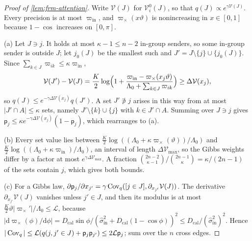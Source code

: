 \begin{proof}[Proof of \cref{lem:frm-attention}]
Write $\mathcal V(J)$ for $\mathcal V^0_i(J)$, so that $q(J)\propto e^{\gamma\mathcal V(J)}$. Every precision is at most $\varpi_{\mathrm{in}}$, and $\varpi_\times(x\vartheta)$ is nonincreasing in $x\in[0,1]$ because $1-\cos$ increases on $[0,\pi]$.

(a) Let $J\ni j$. It holds at most $\kappa-1\le n-2$ in-group senders, so some in-group sender is outside $J$; let $j_0(J)$ be the smallest such and $J'=J\setminus\{j\}\cup\{j_0(J)\}$. Since $\sum_{k\in J}\varpi_{ik}\le\kappa\varpi_{\mathrm{in}}$,
\begin{equation*}
\mathcal V(J')-\mathcal V(J)=\frac K2\log\Bigl(1+\frac{\varpi_{\mathrm{in}}-\varpi_\times(x_j\vartheta)}{\Lambda_0+\sum_{k\in J}\varpi_{ik}}\Bigr)\ge\Delta\mathcal V(x_j),
\end{equation*}
so $q(J)\le e^{-\gamma\Delta\mathcal V(x_j)}q(J')$. A set $J'\not\ni j$ arises in this way from at most $\vert J'\cap A\vert\le\kappa$ sets, namely $J'\setminus\{k\}\cup\{j\}$ with $k\in J'\cap A$. Summing over $J\ni j$ gives $\mathsf p_j\le\kappa e^{-\gamma\Delta\mathcal V(x_j)}(1-\mathsf p_j)$, which rearranges to (a).

(b) Every set value lies between $\frac K2\log((\Lambda_0+\kappa\varpi_\times(\vartheta))/\Lambda_0)$ and $\frac K2\log((\Lambda_0+\kappa\varpi_{\mathrm{in}})/\Lambda_0)$, an interval of length $\Delta\mathcal V_{\max}$, so the Gibbs weights differ by a factor at most $e^{\gamma\Delta\mathcal V_{\max}}$. A fraction $\binom{2n-2}{\kappa-1}/\binom{2n-1}{\kappa}=\kappa/(2n-1)$ of the sets contain $j$, which gives both bounds.

(c) For a Gibbs law, $\partial\mathsf p_j/\partial x_{j'}=\gamma\operatorname{Cov}_q([j\in J],\partial_{x_{j'}}\mathcal V(J))$. The derivative $\partial_{x_{j'}}\mathcal V(J)$ vanishes unless $j'\in J$, and then its modulus is at most $\frac K2\vartheta\vert\varpi_\times'\vert/\Lambda_0\le\mathcal L$, because $\vert\mathrm d\varpi_\times(\phi)/\mathrm d\phi\vert=D_{\mathrm{cal}}\sin\phi/(\hat\sigma^2_{\mathrm{in}}+D_{\mathrm{cal}}(1-\cos\phi))^2\le D_{\mathrm{cal}}/(\hat\sigma^2_{\mathrm{in}})^2$. Hence $\vert\operatorname{Cov}_q\vert\le\mathcal L(q(j,j'\in J)+\mathsf p_j\mathsf p_{j'})\le2\mathcal L\mathsf p_j$; sum over the $n$ cross edges.
\end{proof}

